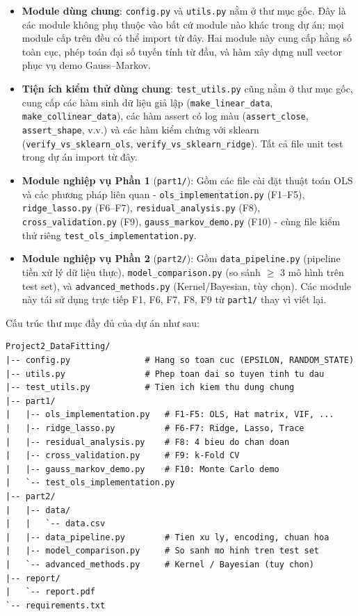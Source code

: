 \begin{itemize}
    \item \textbf{Module dùng chung}: \texttt{config.py} và \texttt{utils.py} nằm ở thư mục gốc. Đây là các module không phụ thuộc vào bất cứ module nào khác trong dự án; mọi module cấp trên đều có thể import từ đây. Hai module này cung cấp hằng số toàn cục, phép toán đại số tuyến tính từ đầu, và hàm xây dựng null vector phục vụ demo Gauss--Markov.
    \item \textbf{Tiện ích kiểm thử dùng chung}: \texttt{test\_utils.py} cũng nằm ở thư mục gốc, cung cấp các hàm sinh dữ liệu giả lập (\texttt{make\_linear\_data}, \texttt{make\_collinear\_data}), các hàm assert có log màu (\texttt{assert\_close}, \texttt{assert\_shape}, v.v.) và các hàm kiểm chứng với sklearn (\texttt{verify\_vs\_sklearn\_ols}, \texttt{verify\_vs\_sklearn\_ridge}). Tất cả file unit test trong dự án import từ đây.
    \item \textbf{Module nghiệp vụ Phần 1} (\texttt{part1/}): Gồm các file cài đặt thuật toán OLS và các phương pháp liên quan - \texttt{ols\_implementation.py} (F1--F5), \texttt{ridge\_lasso.py} (F6--F7), \texttt{residual\_analysis.py} (F8), \texttt{cross\_validation.py} (F9), \texttt{gauss\_markov\_demo.py} (F10) - cùng file kiểm thử riêng \texttt{test\_ols\_implementation.py}.
    \item \textbf{Module nghiệp vụ Phần 2} (\texttt{part2/}): Gồm \texttt{data\_pipeline.py} (pipeline tiền xử lý dữ liệu thực), \texttt{model\_comparison.py} (so sánh \(\ge\) 3 mô hình trên test set), và \texttt{advanced\_methods.py} (Kernel/Bayesian, tùy chọn). Các module này tái sử dụng trực tiếp F1, F6, F7, F8, F9 từ \texttt{part1/} thay vì viết lại.
\end{itemize}

Cấu trúc thư mục đầy đủ của dự án như sau:

\begin{tcolorbox}[mycodebox]
\begin{verbatim}
Project2_DataFitting/
|-- config.py               # Hang so toan cuc (EPSILON, RANDOM_STATE)
|-- utils.py                # Phep toan dai so tuyen tinh tu dau
|-- test_utils.py           # Tien ich kiem thu dung chung
|-- part1/
|   |-- ols_implementation.py   # F1-F5: OLS, Hat matrix, VIF, ...
|   |-- ridge_lasso.py          # F6-F7: Ridge, Lasso, Trace
|   |-- residual_analysis.py    # F8: 4 bieu do chan doan
|   |-- cross_validation.py     # F9: k-Fold CV
|   |-- gauss_markov_demo.py    # F10: Monte Carlo demo
|   `-- test_ols_implementation.py
|-- part2/
|   |-- data/
|   |   `-- data.csv
|   |-- data_pipeline.py        # Tien xu ly, encoding, chuan hoa
|   |-- model_comparison.py     # So sanh mo hinh tren test set
|   `-- advanced_methods.py     # Kernel / Bayesian (tuy chon)
|-- report/
|   `-- report.pdf
`-- requirements.txt
\end{verbatim}
\end{tcolorbox}

